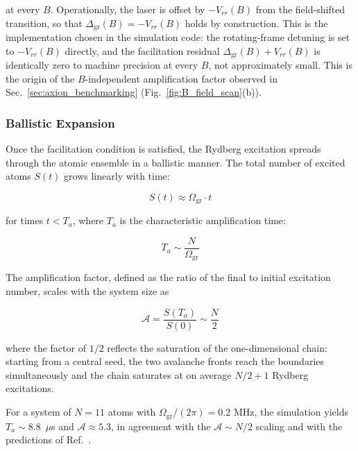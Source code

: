 at every $B$. Operationally, the laser is offset by $-V_{rr}(B)$ from the field-shifted transition, so that $\Delta_{\mathrm{gr}}(B) = -V_{rr}(B)$ holds by construction. This is the implementation chosen in the simulation code: the rotating-frame detuning is set to $-V_{rr}(B)$ directly, and the facilitation residual $\Delta_{\mathrm{gr}}(B) + V_{rr}(B)$ is identically zero to machine precision at every $B$, not approximately small. This is the origin of the $B$-independent amplification factor observed in Sec.~\ref{sec:axion_benchmarking} (Fig.~\ref{fig:B_field_scan}(b)).

\subsubsection{Ballistic Expansion}

Once the facilitation condition is satisfied, the Rydberg excitation spreads through the atomic ensemble in a ballistic manner. The total number of excited atoms $S(t)$ grows linearly with time:

\begin{equation}
    S(t) \approx \Omega_{\mathrm{gr}} \cdot t
    \label{eq:ballistic_growth}
\end{equation}

for times $t < T_a$, where $T_a$ is the characteristic amplification time:

\begin{equation}
    T_a \sim \frac{N}{\Omega_{\mathrm{gr}}}
    \label{eq:amplification_time}
\end{equation}

The amplification factor, defined as the ratio of the final to initial excitation number, scales with the system size as

\begin{equation}
    \mathcal{A} = \frac{S(T_a)}{S(0)} \sim \frac{N}{2}
    \label{eq:amplification_factor}
\end{equation}

where the factor of $1/2$ reflects the saturation of the one-dimensional chain: starting from a central seed, the two avalanche fronts reach the boundaries simultaneously and the chain saturates at on average $N/2 + 1$ Rydberg excitations.

For a system of $N = 11$ atoms with $\Omega_{\mathrm{gr}}/(2\pi) = 0.2$ MHz, the simulation yields $T_a \sim 8.8$~$\mu$s and $\mathcal{A} \approx 5.3$, in agreement with the $\mathcal{A} \sim N/2$ scaling and with the predictions of Ref.~\cite{Nill2024}.

